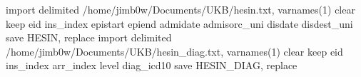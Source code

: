 import delimited /home/jimb0w/Documents/UKB/hesin.txt, varnames(1) clear
keep eid ins_index epistart epiend admidate admisorc_uni disdate disdest_uni
save HESIN, replace
import delimited /home/jimb0w/Documents/UKB/hesin_diag.txt, varnames(1) clear
keep eid ins_index arr_index level diag_icd10
save HESIN_DIAG, replace
